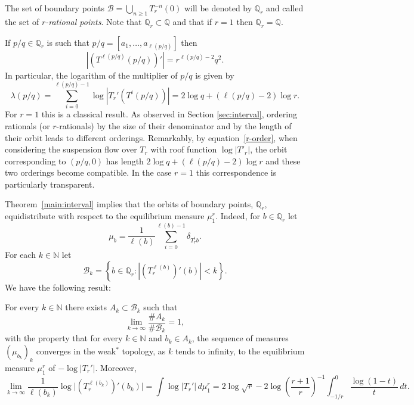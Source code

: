 \documentclass[letterpaper,11pt]{amsart}
\numberwithin{equation}{section}     %
\newcommand{\N}{\mathbb{N}}
\def\N{{\mathbb N}}
\def\B{{\mathcal B}}
\begin{document}
The set of boundary points  $\B= \bigcup_{n \geq 1} T_r^{-n}(0)$ will be denoted by $\mathbb{Q}_r$ and called the set of 
 \emph{$r$-rational points}. Note that $\mathbb{Q}_r \subset \mathbb{Q}$ and that if $r=1$ then $\mathbb{Q}_r=\mathbb{Q}$. 
 
\begin{remark}
If  $p/q \in \mathbb{Q}_r$ is such that $p/q=[a_1, \dots , a_{\ell(p/q)}]$ then
\begin{equation*}
|(T^{\ell(p/q)}(p/q))'|= r^{\ell(p/q) -2} q^2.
\end{equation*}
In particular, the logarithm of the multiplier of $p/q$ is given by 
\begin{equation} \label{r-order}
\lambda(p/q)= \sum_{i=0}^{\ell(p/q)-1} \log|T_r'(T^i(p/q))| = 2\log q + (\ell(p/q) -2) \log r.
\end{equation}
For $r=1$ this is a classical result. As observed in Section \ref{sec:interval}, ordering rationals (or $r$-rationals) by the size of their denominator and by the length of their orbit leads to different orderings. Remarkably, by equation~\eqref{r-order}, when considering the suspension flow over $T_r$ with roof function $\log|T'_r|$, the orbit corresponding to $(p/q, 0)$ has length $ 2\log q + (\ell(p/q) -2) \log r$ and these two orderings become compatible. In the case $r=1$ this correspondence is particularly transparent.
\end{remark}





Theorem~\ref{main:interval} implies that the orbits of boundary points, $\mathbb{Q}_r$, equidistribute with respect to the equilibrium  measure $\mu_1^r$.  Indeed, for $b \in \mathbb{Q}_r$ let
\begin{equation*}
\mu_b= \frac{1}{\ell(b)} \sum_{i=0}^{\ell(b)-1} \delta_{T_r^i b}.
\end{equation*}
For each $k \in \N$ let
\begin{equation*}
\B_k= \left\{b \in \mathbb{Q}_r :	|(T_r^{\ell(b)})'(b)| < k 	\right\}.
\end{equation*}
We have the following result:


\begin{theorem} \label{thm-cont-frac}
  For every $k\in\N$ there exists $A_k\subset \B_k$ such that
\[
\lim_{k\to\infty} \frac{\# A_k}{\# \B_k} = 1,
\]
with the property that for every $k\in \N$ and $b_k\in A_k$,  the sequence of measures $(\mu_{b_k})_k$ converges in the weak$^\ast$ topology, as $k$ tends to infinity, to the equilibrium measure $\mu_1^r$ of $-\log|T_r'|$. Moreover, 
\[
\lim_{k\to\infty}
\frac{1}{\ell(b_k)}
\log \big|(T_r^{\ell(b_k)})'(b_k)\big|
=
\int \log |T_r'| \, d\mu_1^r
=
2 \log \sqrt{r}
-
2 \log \left(\frac{r+1}{r}\right)^{-1}
\int_{-1/r}^0 \frac{\log(1-t)}{t}\, dt .
\]
 \end{theorem}
\end{document}
